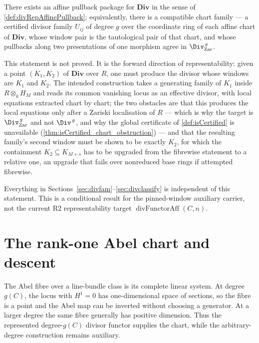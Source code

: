\begin{theorem}
  \label{thm:divRepUniversalFamily}
  \notready
  There exists an affine pullback package for \(\mathbf{Div}\) in the sense of
  \ref{def:divRepAffinePullback}; equivalently, there is a compatible chart family --- a
  certified divisor family \(U_{ij}\) of degree \(g\) over the coordinate ring of each
  affine chart of \(\mathbf{Div}\), whose window pair is the tautological pair of that
  chart, and whose pullbacks along two presentations of one morphism agree in
  \(\Div^{\,g}_{\mathrm{Zar}}\).

  This statement is not proved. It is the forward direction of representability: given a
  point \((K_1, K_2)\) of \(\mathbf{Div}\) over \(R\), one must produce the divisor whose
  windows are \(K_1\) and \(K_2\). The intended construction takes a generating family of
  \(K_1\) inside \(R \otimes_k H_M\) and reads its common vanishing locus as an effective
  divisor, with local equations extracted chart by chart; the two obstacles are that this
  produces the local equations only after a Zariski localisation of \(R\) --- which is why
  the target is \(\Div^{\,g}_{\mathrm{Zar}}\) and not \(\Div^{\,g}\), and why the global
  certificate of \ref{def:isCertified} is unavailable
  (\ref{thm:isCertified_chart_obstruction}) --- and that the resulting family's second
  window must be shown to be exactly \(K_2\), for which the containment
  \(K_2 \subseteq K_{M+s}\) has to be upgraded from the fibrewise statement to a relative
  one, an upgrade that fails over nonreduced base rings if attempted fibrewise.

  Everything in Sections~\ref{sec:divfam}--\ref{sec:divclassify} is independent of this
  statement. This is a conditional result for the pinned-window auxiliary carrier, not the
  current R2 representability target \(\operatorname{divFunctorAff}(C,n)\).
\end{theorem}

\section{The rank-one Abel chart and descent}
\label{sec:rankOneAbelDescent}

The Abel fibre over a line-bundle class is its complete linear system.  At degree \(g(C)\),
the locus with \(H^1=0\) has one-dimensional space of sections, so the fibre is a point and
the Abel map can be inverted without choosing a generator.  At a larger degree the same
fibre generally has positive dimension.  Thus the represented degree-\(g(C)\) divisor
functor supplies the chart, while the arbitrary-degree construction remains auxiliary.

